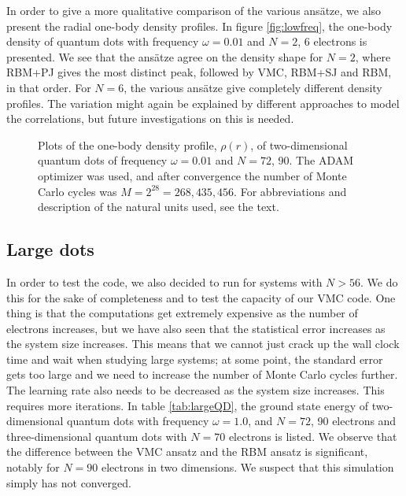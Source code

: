 In order to give a more qualitative comparison of the various ansätze, we also present the radial one-body density profiles. In figure \eqref{fig:lowfreq}, the one-body density of quantum dots with frequency $\omega=0.01$ and $N=2$, 6 electrons is presented. We see that the ansätze agree on the density shape for $N=2$, where RBM+PJ gives the most distinct peak, followed by VMC, RBM+SJ and RBM, in that order. For $N=6$, the various ansätze give completely different density profiles. The variation might again be explained by different approaches to model the correlations, but future investigations on this is needed.

\begin{figure}
	\centering
	\captionsetup[subfigure]{labelformat=empty}
	
	\caption{Plots of the one-body density profile, $\rho(r)$, of two-dimensional quantum dots of frequency $\omega=0.01$ and $N=72$, 90. The ADAM optimizer was used, and after convergence the number of Monte Carlo cycles was $M=2^{28}=268,435,456$. For abbreviations and description of the natural units used, see the text.}
	\label{fig:lowfreq}
\end{figure}

\subsection{Large dots}
In order to test the code, we also decided to run for systems with $N>56$. We do this for the sake of completeness and to test the capacity of our VMC code. One thing is that the computations get extremely expensive as the number of electrons increases, but we have also seen that the statistical error increases as the system size increases. This means that we cannot just crack up the wall clock time and wait when studying large systems; at some point, the standard error gets too large and we need to increase the number of Monte Carlo cycles further. The learning rate also needs to be decreased as the system size increases. This requires more iterations. In table \eqref{tab:largeQD}, the ground state energy of two-dimensional quantum dots with frequency $\omega=1.0$, and $N=72$, 90 electrons and three-dimensional quantum dots with $N=70$ electrons is listed. We observe that the difference between the VMC ansatz and the RBM ansatz is significant, notably for $N=90$ electrons in two dimensions. We suspect that this simulation simply has not converged. 

